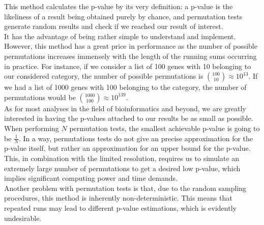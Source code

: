 This method calculates the p-value by its very definition: a p-value is the likeliness of a result being obtained purely by chance, and permutation tests generate random results and check if we reached our result of interest.\\
It has the advantage of being rather simple to understand and implement.\\
However, this method has a great price in performance as the number of possible permutations increases immensely with the length of the running sums occurring in practice. For instance, if we consider a list of 100 genes with 10 belonging to our considered category, the number of possible permutations is $\binom{100}{10}\approx10^{13}$. If we had a list of 1000 genes with 100 belonging to the category, the number of permutations would be $\binom{1000}{100}\approx10^{139}$.\\
As for most analyses in the field of bioinformatics and beyond, we are greatly interested in having the p-values attached to our results be as small as possible.\\
When performing $N$ permutation tests, the smallest achievable p-value is going to be $\frac{1}{N}$. In a way, permutations tests do not give an precise approximation for the p-value itself, but rather an approximation for an upper bound for the p-value. This, in combination with the limited resolution, requires us to simulate an extremely large number of permutations to get a desired low p-value, which implies significant computing power and time demands.\\
Another problem with permutation tests is that, due to the random sampling procedures, this method is inherently non-deterministic. This means that repeated runs may lead to different p-value estimations, which is evidently undesirable.

